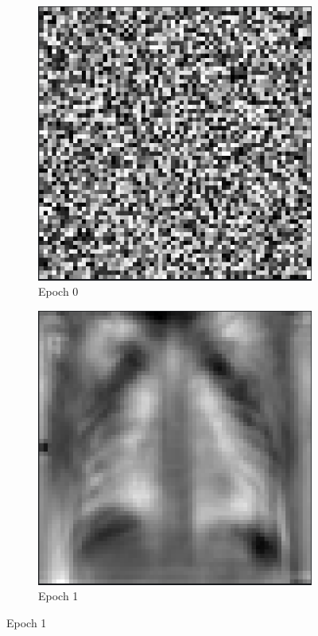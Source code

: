 \documentclass{article}
\begin{document}
\begin{figure}[hbt!]
\centering

\begin{subfigure}{.3\linewidth}
  \includegraphics[width=\linewidth]{assets/perceptron/training-1-epoch-0.png}
  \caption{Epoch 0}
  \label{training-1-epoch-0}
\end{subfigure}
\begin{subfigure}{.3\linewidth}
  \includegraphics[width=\linewidth]{assets/perceptron/training-1-epoch-1.png}
  \caption{Epoch 1}
  \label{training-1-epoch-1}
\end{subfigure}


\end{figure}
\end{document}
